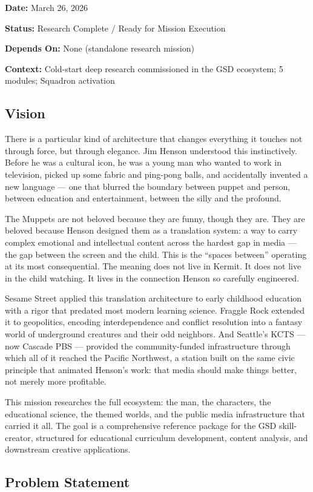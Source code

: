 \documentclass[11pt,letterpaper]{article}
\newcommand{\metafield}[2]{\textbf{\sffamily #1} #2\par}
\begin{document}
\metafield{Date:}{March 26, 2026}
\metafield{Status:}{Research Complete / Ready for Mission Execution}
\metafield{Depends On:}{None (standalone research mission)}
\metafield{Context:}{Cold-start deep research commissioned in the GSD ecosystem; 5 modules; Squadron activation}

\subsection{Vision}

There is a particular kind of architecture that changes everything it touches not through force, but through elegance. Jim Henson understood this instinctively. Before he was a cultural icon, he was a young man who wanted to work in television, picked up some fabric and ping-pong balls, and accidentally invented a new language --- one that blurred the boundary between puppet and person, between education and entertainment, between the silly and the profound.

The Muppets are not beloved because they are funny, though they are. They are beloved because Henson designed them as a translation system: a way to carry complex emotional and intellectual content across the hardest gap in media --- the gap between the screen and the child. This is the ``spaces between'' operating at its most consequential. The meaning does not live in Kermit. It does not live in the child watching. It lives in the connection Henson so carefully engineered.

Sesame Street applied this translation architecture to early childhood education with a rigor that predated most modern learning science. Fraggle Rock extended it to geopolitics, encoding interdependence and conflict resolution into a fantasy world of underground creatures and their odd neighbors. And Seattle's KCTS --- now Cascade PBS --- provided the community-funded infrastructure through which all of it reached the Pacific Northwest, a station built on the same civic principle that animated Henson's work: that media should make things better, not merely more profitable.

This mission researches the full ecosystem: the man, the characters, the educational science, the themed worlds, and the public media infrastructure that carried it all. The goal is a comprehensive reference package for the GSD skill-creator, structured for educational curriculum development, content analysis, and downstream creative applications.

\subsection{Problem Statement}
\end{document}
